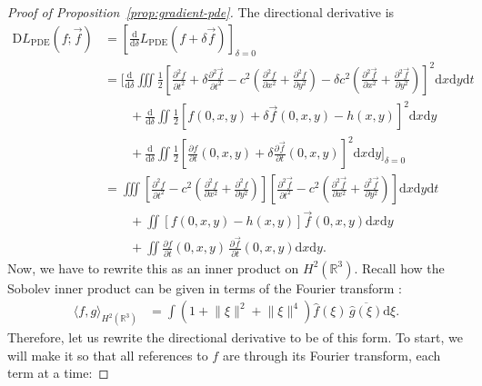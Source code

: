 \documentclass{article}
\newcommand{\R}{\mathbb{R}}
\newcommand{\D}{\mathrm{D}}
\newcommand{\dif}{\mathrm{d}}
\begin{document}
\begin{proof}[Proof of Proposition~\ref{prop:gradient-pde}]
    The directional derivative is
    {\small
    \begin{align*}
        \D L_\mathrm{PDE}(f; \vec{f})
        &= \left[ \frac{\dif}{\dif \delta} L_\mathrm{PDE}(f + \delta \vec{f}) \right]_{\delta=0}
        \\ &= \Biggl[ \frac{\dif}{\dif \delta} \iiint \frac{1}{2} \left[ \frac{\partial^2 f}{\partial t^2} + \delta \frac{\partial^2 \vec{f}}{\partial t^2} - c^2 \left( \frac{\partial^2 f}{\partial x^2} + \frac{\partial^2 f}{\partial y^2} \right) - \delta c^2 \left( \frac{\partial^2 \vec{f}}{\partial x^2} + \frac{\partial^2 \vec{f}}{\partial y^2} \right) \right]^2 \dif x \dif y \dif t
            \\ &\qquad + \frac{\dif}{\dif \delta} \iint \frac{1}{2} \left[ f(0, x, y) + \delta \vec{f}(0, x, y) - h(x, y) \right]^2 \dif x \dif y
            \\ &\qquad + \frac{\dif}{\dif \delta} \iint \frac{1}{2} \left[ \frac{\partial f}{\partial t}(0, x, y) + \delta \frac{\partial \vec{f}}{\partial t}(0, x, y) \right]^2 \dif x \dif y \Biggr]_{\delta=0}
        \\ &= \iiint \left[ \frac{\partial^2 f}{\partial t^2} - c^2 \left( \frac{\partial^2 f}{\partial x^2} + \frac{\partial^2 f}{\partial y^2} \right) \right] \left[ \frac{\partial^2 \vec{f}}{\partial t^2} - c^2 \left( \frac{\partial^2 \vec{f}}{\partial x^2} + \frac{\partial^2 \vec{f}}{\partial y^2} \right) \right] \dif x \dif y \dif t
            \\ &\qquad + \iint \left[ f(0, x, y) - h(x, y) \right] \vec{f}(0, x, y) \dif x \dif y
            \\ &\qquad + \iint \frac{\partial f}{\partial t}(0, x, y) \, \frac{\partial \vec{f}}{\partial t}(0, x, y) \dif x \dif y.
    \end{align*}
    }
    Now, we have to rewrite this as an inner product on $H^2(\R^3)$.
    Recall how the Sobolev inner product can be given in terms of the Fourier transform \citep{evans}:
    \begin{align*}
        \langle f, g \rangle_{H^2(\R^3)}
        &= \int \left( 1 + \lVert \xi \rVert^2 + \lVert \xi \rVert^4 \right) \widehat{f}(\xi) \, \overline{\widehat{g}(\xi)} \dif \xi.
    \end{align*}
    Therefore, let us rewrite the directional derivative to be of this form. To start, we will make it so that all references to $f$ are through its Fourier transform, each term at a time:

\end{proof}
\end{document}
